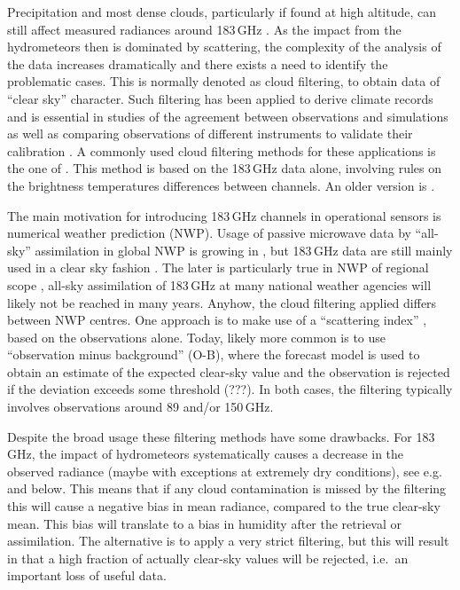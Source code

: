 \documentclass[amt, manuscript]{copernicus}
\begin{document}
Precipitation and most dense clouds, particularly if found at high altitude, can
still affect measured radiances around 183\,GHz
\citep[e.g.][]{bennartz2003sensitivity}. As the impact from the hydrometeors
then is dominated by scattering, the complexity of the analysis of the data
increases dramatically and there exists a need to identify the problematic
cases. This is normally denoted as cloud filtering, to obtain data of ``clear
sky'' character. Such filtering has been applied to derive climate records
\citep{lang2020new} and is essential in studies of the agreement between
observations and simulations \citep{brogniez2016review} as well as 
comparing observations of different instruments to validate their calibration
\citep{john2013assessment,moradi:retri:15,berg2016intercalibration}. A commonly
used cloud filtering methods for these applications is the one of
\citet{buehler:aclou:07}. This method is based on the 183\,GHz data alone,
involving rules on the brightness temperatures differences between channels. An
older version is \citet{burns1997effects}.

The main motivation for introducing 183\,GHz channels in operational sensors is
numerical weather prediction (NWP). Usage of passive microwave data by
``all-sky'' assimilation in global NWP is growing in \citep{geer2017growing},
but 183\,GHz data are still mainly used in a clear sky fashion
\citep{geer2018all}. The later is particularly true in NWP of regional scope
\citep{gustafsson2018survey}, all-sky assimilation of 183\,GHz at many national
weather agencies will likely not be reached in many years. Anyhow, the cloud
filtering applied differs between NWP centres. One approach is to make use of a
``scattering index'' \citep{bennartz2002precipitation}, based on the
observations alone. Today, likely more common is to use ``observation minus
background'' (O-B), where the forecast model is used to obtain an estimate of
the expected clear-sky value and the observation is rejected if the deviation
exceeds some threshold (???). In both cases, the filtering typically involves
observations around 89 and/or 150\,GHz.

Despite the broad usage these filtering methods have some drawbacks. For
183\,GHz, the impact of hydrometeors systematically causes a decrease in the
observed radiance (maybe with exceptions at extremely dry conditions), see
e.g.\ \citet{barlakas:three:20} and below. This means that if any cloud
contamination is missed by the filtering this will cause a negative bias in
mean radiance, compared to the true clear-sky mean. This bias will translate to
a bias in humidity after the retrieval or assimilation. The alternative is to
apply a very strict filtering, but this will result in that a high fraction of
actually clear-sky values will be rejected, i.e.\ an important loss of useful
data.
\end{document}
